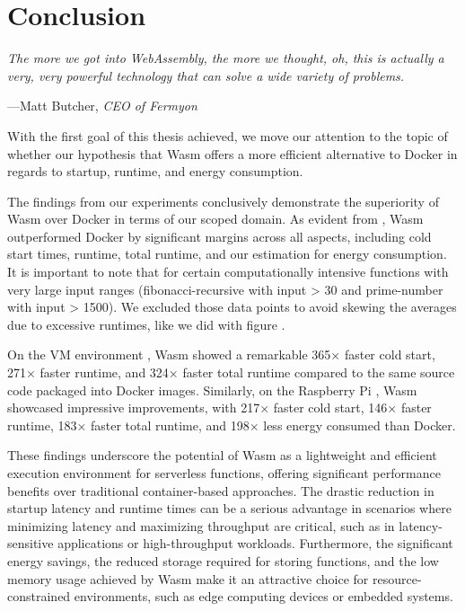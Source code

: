 \documentclass[
  table]{report}
\begin{document}
\newpage
\chapter{Conclusion}

\epigraph{\itshape  
The more we got into WebAssembly, the more we thought, oh, this is actually a very, very powerful technology that can solve a wide variety of problems.
}{---Matt Butcher, \textit{CEO of Fermyon}}

With the first goal of this thesis achieved, we move our attention to
the topic of whether our hypothesis that Wasm offers a more efficient
alternative to Docker in regards to startup, runtime, and energy
consumption.

The findings from our experiments conclusively demonstrate the
superiority of \ac{Wasm} over Docker in terms of our scoped domain. As
evident from , Wasm outperformed Docker
by significant margins across all aspects, including cold start times,
runtime, total runtime, and our estimation for energy consumption. It is
important to note that for certain computationally intensive functions
with very large input ranges (fibonacci-recursive with input
\textgreater{} 30 and prime-number with input \textgreater{} 1500). We
excluded those data points to avoid skewing the averages due to
excessive runtimes, like we did with figure
.

On the VM environment , Wasm showed a remarkable 365×
faster cold start, 271× faster runtime, and 324× faster total runtime
compared to the same source code packaged into Docker images. Similarly,
on the Raspberry Pi , Wasm showcased impressive
improvements, with 217× faster cold start, 146× faster runtime, 183×
faster total runtime, and 198× less energy consumed than Docker.

These findings underscore the potential of Wasm as a lightweight and
efficient execution environment for serverless functions, offering
significant performance benefits over traditional container-based
approaches. The drastic reduction in startup latency and runtime times
can be a serious advantage in scenarios where minimizing latency and
maximizing throughput are critical, such as in latency-sensitive
applications or high-throughput workloads. Furthermore, the significant
energy savings, the reduced storage required for storing functions, and
the low memory usage \citep{shillakerFaasmLightweightIsolation2020a}
achieved by \ac{Wasm} make it an attractive choice for
resource-constrained environments, such as edge computing devices or
embedded systems.
\end{document}
